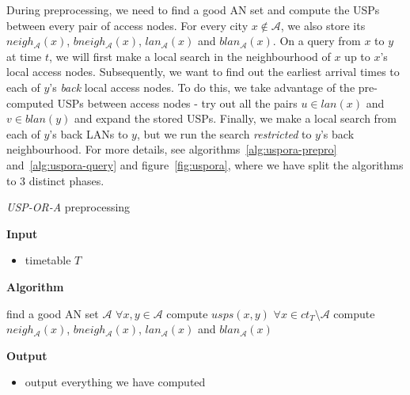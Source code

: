 	During preprocessing, we need to find a good AN set and compute the USPs between every pair of access nodes. For every city $x \not \in \mathcal{A}$, we also store its $neigh_{\mathcal{A}}(x)$, $bneigh_{\mathcal{A}}(x)$, $lan_{\mathcal{A}}(x)$ and $blan_{\mathcal{A}}(x)$. On a query from $x$ to $y$ at time $t$, we will first make a local search in the neighbourhood of $x$ up to $x$'s local access nodes. Subsequently, we want to find out the earliest arrival times to each of $y$'s \textit{back} local access nodes. To do this, we take advantage of the pre-computed USPs between access nodes - try out all the pairs $u \in lan(x)$ and $v \in blan(y)$ and expand the stored USPs. Finally, we make a local search from each of $y$'s back LANs to $y$, but we run the search \textit{restricted} to $y$'s back neighbourhood. For more details, see algorithms~\ref{alg:uspora-prepro} and~\ref{alg:uspora-query} and figure~\ref{fig:uspora}, where we have split the algorithms to 3 distinct phases.
	
	\color{algcolor}
	\begin{algorithm}[H]
		\color{inalgcolor}
		\caption{\textit{USP-OR-A} preprocessing}
		\label{alg:uspora-prepro}
		\textbf{Input} 
		\begin{itemize}
			\item timetable $T$
		\end{itemize}
		\textbf{Algorithm}
		\begin{algorithmic}
			\STATE find a good AN set $\mathcal{A}$
			\STATE $\forall x, y \in \mathcal{A}$ compute $usps(x, y)$
			\STATE $\forall x \in ct_{T} \setminus \mathcal{A}$ compute $neigh_{\mathcal{A}}(x)$, $bneigh_{\mathcal{A}}(x)$, $lan_{\mathcal{A}}(x)$ and $blan_{\mathcal{A}}(x)$
		\end{algorithmic}
		\textbf{Output}
		\begin{itemize}
			\item output everything we have computed
		\end{itemize}
	\end{algorithm}
	\color{black}
	
